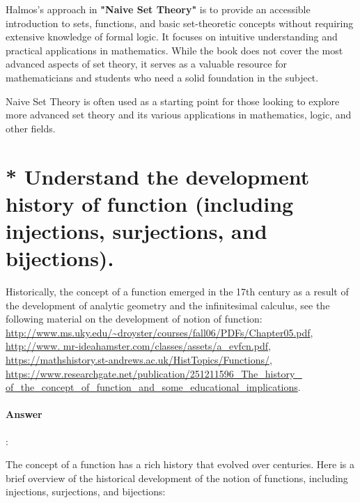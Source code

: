 \documentclass{article}
\begin{document}
Halmos's approach in \textbf{"Naive Set Theory"} is to provide an accessible introduction to sets, functions, and basic set-theoretic concepts without requiring extensive knowledge of formal logic. It focuses on intuitive understanding and practical applications in mathematics. While the book does not cover the most advanced aspects of set theory, it serves as a valuable resource for mathematicians and students who need a solid foundation in the subject.

Naive Set Theory is often used as a starting point for those looking to explore more advanced set theory and its various applications in mathematics, logic, and other fields.


\section{* Understand the development history of function (including injections, surjections, and bijections).}

\begin{tcolorbox}
  Historically, the concept of a function emerged in the 17th century as a result of the development of analytic geometry and the infinitesimal calculus, see the following material on the development of notion of function: \url{http://www.ms.uky.edu/~droyster/courses/fall06/PDFs/Chapter05.pdf}, \url{http://www. mr-ideahamster.com/classes/assets/a_evfcn.pdf}, \url{https://mathshistory.st-andrews.ac.uk/HistTopics/Functions/}, \url{https://www.researchgate.net/publication/251211596_The_history_ of_the_concept_of_function_and_some_educational_implications}.
\end{tcolorbox}

\paragraph{Answer}:

The concept of a function has a rich history that evolved over centuries. Here is a brief overview of the historical development of the notion of functions, including injections, surjections, and bijections:
\end{document}
